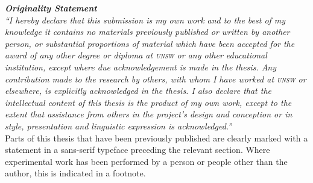 \begin{center}
\begin{minipage}{0.75\textwidth}
\vspace{4cm}
  \textit{
    \textbf{Originality Statement}\\
    ``I hereby declare that this submission is my own work and to the best of my knowledge it contains no materials previously published or written by another person, or substantial proportions of material which have been accepted for the award of any other degree or diploma at \textsc{unsw} or any other educational institution, except where due acknowledgement is made in the thesis. 
    Any contribution made to the research by others, with whom I have worked at \textsc{unsw} or elsewhere, is explicitly acknowledged in the thesis. 
    I also declare that the intellectual content of this thesis is the product of my own work, except to the extent that assistance from others in the project's design and conception or in style, presentation and linguistic expression is acknowledged.''
  }
  \vspace{2cm}\\
  Parts of this thesis that have been previously published are clearly marked with a statement in a sans-serif typeface preceding the relevant section.
  Where experimental work has been performed by a person or people other than the author, this is indicated in a footnote.
\end{minipage}
\end{center}
